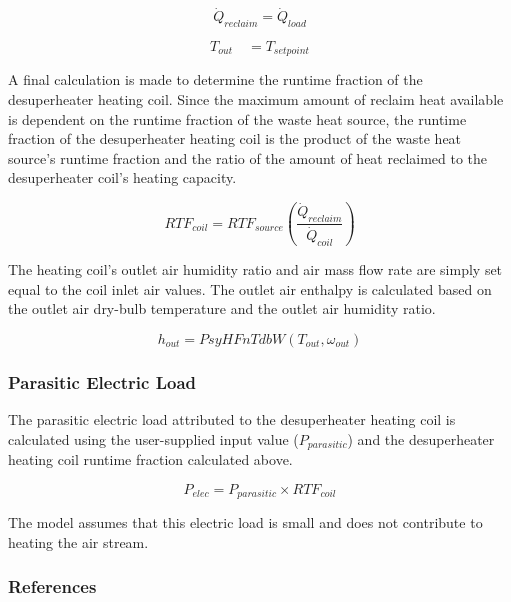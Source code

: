 \begin{equation}
{\dot Q_{reclaim}} = {\dot Q_{load}}
\end{equation}

\begin{equation}
{T_{out}}\quad = {T_{setpoint}}
\end{equation}

A final calculation is made to determine the runtime fraction of the desuperheater heating coil. Since the maximum amount of reclaim heat available is dependent on the runtime fraction of the waste heat source, the runtime fraction of the desuperheater heating coil is the product of the waste heat source's runtime fraction and the ratio of the amount of heat reclaimed to the desuperheater coil's heating capacity.

\begin{equation}
RT{F_{coil}} = RT{F_{source}}\left( {\frac{{{{\dot Q}_{reclaim}}}}{{{{\dot Q}_{coil}}}}} \right)
\end{equation}

The heating coil's outlet air humidity ratio and air mass flow rate are simply set equal to the coil inlet air values. The outlet air enthalpy is calculated based on the outlet air dry-bulb temperature and the outlet air humidity ratio.

\begin{equation}
{h_{out}} = PsyHFnTdbW({T_{out}},{\omega_{out}})
\end{equation}

\subsubsection{Parasitic Electric Load}\label{parasitic-electric-load}

The parasitic electric load attributed to the desuperheater heating coil is calculated using the user-supplied input value (\({P_{parasitic}}\)) and the desuperheater heating coil runtime fraction calculated above.

\begin{equation}
{P_{elec}} = {P_{parasitic}} \times RT{F_{coil}}
\end{equation}

The model assumes that this electric load is small and does not contribute to heating the air stream.

\subsubsection{References}\label{references-7}

